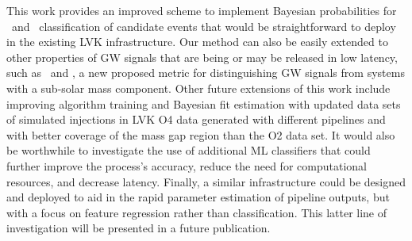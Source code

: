 This work provides an improved scheme to implement Bayesian probabilities for \hasns\ and \hasrem\ classification of candidate events that would be straightforward to deploy in the existing LVK
infrastructure. Our method can also be easily extended to other properties of \ac{GW} signals that are being or may be released in low latency, such as \hasgap\ and \hasssm, a new proposed metric for
distinguishing \ac{GW} signals from systems with a sub-solar mass component. Other future extensions of this work include improving algorithm training and Bayesian fit estimation with updated data
sets of simulated injections in \ac{LVK} \ac{O4} data generated with different pipelines and with better coverage of the mass gap region than the \ac{O2} data set. It would also be worthwhile to
investigate the use of additional ML classifiers that could further improve the process's accuracy, reduce the need for computational resources, and decrease latency. Finally, a similar
infrastructure could be designed and deployed to aid in the rapid parameter estimation of pipeline outputs, but with a focus on feature regression rather than classification. This latter line of
investigation will be presented in a future publication.





